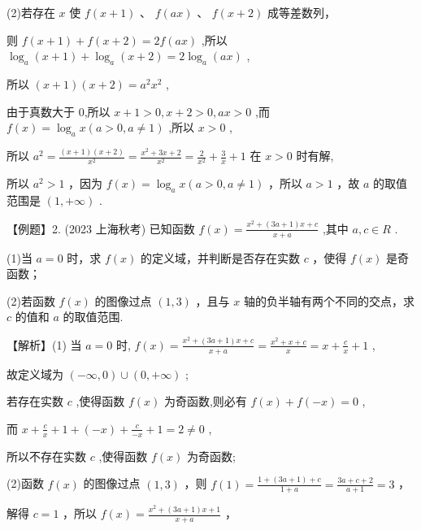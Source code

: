 \documentclass[10pt]{article}
\begin{document}
(2)若存在 \(x\) 使 \(f\left( {x + 1}\right)\) 、 \(f\left( {ax}\right)\) 、 \(f\left( {x + 2}\right)\) 成等差数列，

则 \(f\left( {x + 1}\right)  + f\left( {x + 2}\right)  = {2f}\left( {ax}\right)\) ,所以 \({\log }_{a}\left( {x + 1}\right)  + {\log }_{a}\left( {x + 2}\right)  = 2{\log }_{a}\left( {ax}\right)\) ,

所以 \(\left( {x + 1}\right) \left( {x + 2}\right)  = {a}^{2}{x}^{2}\) ,

由于真数大于 0,所以 \(x + 1 > 0,x + 2 > 0,{ax} > 0\) ,而 \(f\left( x\right)  = {\log }_{a}x\left( {a > 0,a \neq  1}\right)\) ,所以 \(x > 0\) ,

所以 \({a}^{2} = \frac{\left( {x + 1}\right) \left( {x + 2}\right) }{{x}^{2}} = \frac{{x}^{2} + {3x} + 2}{{x}^{2}} = \frac{2}{{x}^{2}} + \frac{3}{x} + 1\) 在 \(x > 0\) 时有解,

所以 \({a}^{2} > 1\) ，因为 \(f\left( x\right)  = {\log }_{a}x\left( {a > 0,a \neq  1}\right)\) ，所以 \(a > 1\) ，故 \(a\) 的取值范围是 \(\left( {1, + \infty }\right)\) .

【例题】2. (2023 上海秋考) 已知函数 \(f\left( x\right)  = \frac{{x}^{2} + \left( {{3a} + 1}\right) x + c}{x + a}\) ,其中 \(a,c \in  R\) .

(1)当 \(a = 0\) 时，求 \(f\left( x\right)\) 的定义域，并判断是否存在实数 \(c\) ，使得 \(f\left( x\right)\) 是奇函数；

(2)若函数 \(f\left( x\right)\) 的图像过点 \(\left( {1,3}\right)\) ，且与 \(x\) 轴的负半轴有两个不同的交点，求 \(c\) 的值和 \(a\) 的取值范围.

【解析】(1) 当 \(a = 0\) 时, \(f\left( x\right)  = \frac{{x}^{2} + \left( {{3a} + 1}\right) x + c}{x + a} = \frac{{x}^{2} + x + c}{x} = x + \frac{c}{x} + 1\) ,

故定义域为 \(\left( {-\infty ,0}\right)  \cup  \left( {0, + \infty }\right)\) ;

若存在实数 \(c\) ,使得函数 \(f\left( x\right)\) 为奇函数,则必有 \(f\left( x\right)  + f\left( {-x}\right)  = 0\) ,

而 \(x + \frac{c}{x} + 1 + \left( {-x}\right)  + \frac{c}{-x} + 1 = 2 \neq  0\) ,

所以不存在实数 \(c\) ,使得函数 \(f\left( x\right)\) 为奇函数;

(2)函数 \(f\left( x\right)\) 的图像过点 \(\left( {1,3}\right)\) ，则 \(f\left( 1\right)  = \frac{1 + \left( {{3a} + 1}\right)  + c}{1 + a} = \frac{{3a} + c + 2}{a + 1} = 3\) ，

解得 \(c = 1\) ，所以 \(f\left( x\right)  = \frac{{x}^{2} + \left( {{3a} + 1}\right) x + 1}{x + a}\) ，
\end{document}
